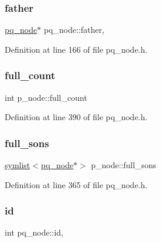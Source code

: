 \subsubsection{\texorpdfstring{father}{father}}
{\footnotesize\ttfamily \mbox{\hyperlink{classpq__node}{pq\+\_\+node}}$\ast$ pq\+\_\+node\+::father\hspace{0.3cm}{\ttfamily [protected]}, {\ttfamily [inherited]}}



Definition at line 166 of file pq\+\_\+node.\+h.

\mbox{\label{classp__node_a67a7570ace6b26d3bcbff7cf71c85cb0}} 
\subsubsection{\texorpdfstring{full\+\_\+count}{full\_count}}
{\footnotesize\ttfamily int p\+\_\+node\+::full\+\_\+count\hspace{0.3cm}{\ttfamily [private]}}



Definition at line 390 of file pq\+\_\+node.\+h.

\mbox{\label{classp__node_a09658fb7a7212e51b877444e4cee4378}} 
\subsubsection{\texorpdfstring{full\+\_\+sons}{full\_sons}}
{\footnotesize\ttfamily \mbox{\hyperlink{classsymlist}{symlist}}$<$\mbox{\hyperlink{classpq__node}{pq\+\_\+node}}$\ast$$>$ p\+\_\+node\+::full\+\_\+sons\hspace{0.3cm}{\ttfamily [private]}}



Definition at line 365 of file pq\+\_\+node.\+h.

\mbox{\label{classpq__node_ad0034c1f93c3c77edb6d3a03f25aba06}} 
\subsubsection{\texorpdfstring{id}{id}}
{\footnotesize\ttfamily int pq\+\_\+node\+::id\hspace{0.3cm}{\ttfamily [protected]}, {\ttfamily [inherited]}}



